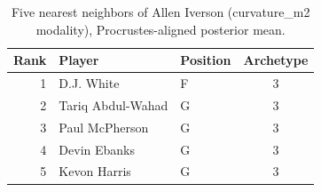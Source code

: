 \begin{table}[htbp]
  \centering\small
  \begin{tabular}{rllc}
    \toprule
    Rank & Player & Position & Archetype \\
    \midrule
    1 & D.J. White & F & 3 \\
    2 & Tariq Abdul-Wahad & G & 3 \\
    3 & Paul McPherson & G & 3 \\
    4 & Devin Ebanks & G & 3 \\
    5 & Kevon Harris & G & 3 \\
    \bottomrule
  \end{tabular}
  \caption{Five nearest neighbors of Allen Iverson (curvature_m2 modality), Procrustes-aligned posterior mean.}
  \label{tab:Allen_Iverson_neighbors_curvature_m2}
\end{table}

